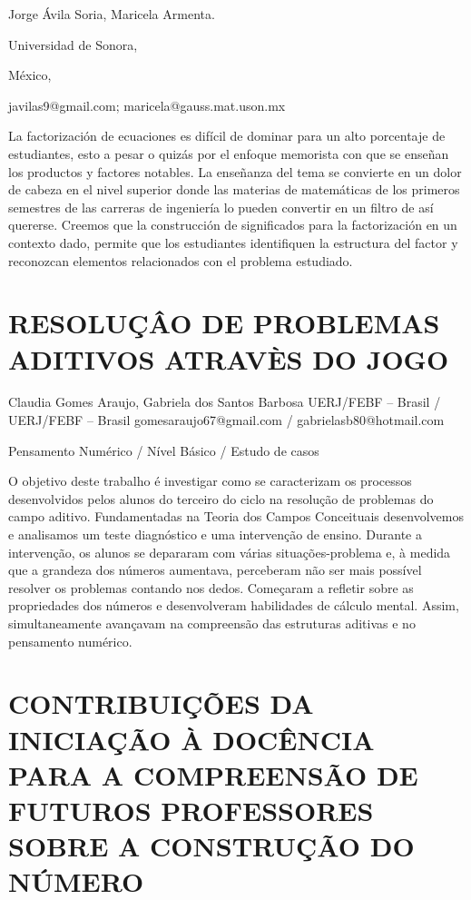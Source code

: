 \begin{datos}

Jorge Ávila Soria, Maricela Armenta.

Universidad de Sonora, 

México,

javilas9@gmail.com; maricela@gauss.mat.uson.mx 

\end{datos}

La factorización de ecuaciones es difícil de dominar para un alto
porcentaje de estudiantes, esto a pesar o quizás por el enfoque memorista
con que se enseñan los productos y factores notables. La enseñanza
del tema se convierte en un dolor de cabeza en el nivel superior donde
las materias de matemáticas de los primeros semestres de las carreras
de ingeniería lo pueden convertir en un filtro de así quererse. Creemos
que la construcción de significados para la factorización en un contexto
dado, permite que los estudiantes identifiquen la estructura del factor
y reconozcan elementos relacionados con el problema estudiado. 


\section{RESOLUÇÂO DE PROBLEMAS ADITIVOS ATRAVÈS DO JOGO }

\begin{datos}

Claudia Gomes Araujo, Gabriela dos Santos Barbosa UERJ/FEBF – Brasil
/ UERJ/FEBF – Brasil gomesaraujo67@gmail.com / gabrielasb80@hotmail.com

\end{datos}

Pensamento Numérico / Nível Básico / Estudo de casos

O objetivo deste trabalho é investigar como se caracterizam os processos
desenvolvidos pelos alunos do terceiro do ciclo na resolução de problemas
do campo aditivo. Fundamentadas na Teoria dos Campos Conceituais desenvolvemos
e analisamos um teste diagnóstico e uma intervenção de ensino. Durante
a intervenção, os alunos se depararam com várias situações-problema
e, à medida que a grandeza dos números aumentava, perceberam não ser
mais possível resolver os problemas contando nos dedos. Começaram
a refletir sobre as propriedades dos números e desenvolveram habilidades
de cálculo mental. Assim, simultaneamente avançavam na compreensão
das estruturas aditivas e no pensamento numérico.


\section{CONTRIBUIÇÕES DA INICIAÇÃO À DOCÊNCIA PARA A COMPREENSÃO DE FUTUROS
PROFESSORES SOBRE A CONSTRUÇÃO DO NÚMERO}

